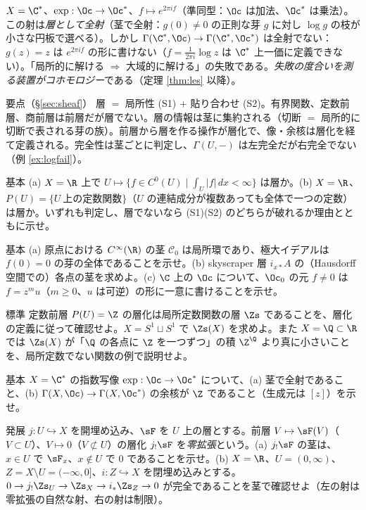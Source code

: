 \begin{ex}[全射な層の射だが大域切断は全射でない]\label{ex:logfail}
$X=\C^*$、$\exp:\Oc\to\Oc^*$、$f\mapsto e^{2\pi if}$（準同型：$\Oc$ は加法、$\Oc^*$ は乗法）。この射は\emph{層として全射}（茎で全射：$g(0)\ne0$ の正則な芽 $g$ に対し $\log g$ の枝が小さな円板で選べる）。しかし $\Gamma(\C^*,\Oc)\to\Gamma(\C^*,\Oc^*)$ は全射でない：$g(z)=z$ は $e^{2\pi if}$ の形に書けない（$f=\frac1{2\pi i}\log z$ は $\C^*$ 上一価に定義できない）。「局所的に解ける $\Rightarrow$ 大域的に解ける」の失敗である。\emph{失敗の度合いを測る装置がコホモロジー}である（定理 \ref{thm:les} 以降）。
\end{ex}

\begin{keybox}{要点（§\ref{sec:sheaf}）}
層 $=$ 局所性 (S1) $+$ 貼り合わせ (S2)。有界関数、定数前層、商前層は前層だが層でない。層の情報は茎に集約される（切断 $=$ 局所的に切断で表される芽の族）。前層から層を作る操作が層化で、像・余核は層化を経て定義される。完全性は茎ごとに判定し、$\Gamma(U,-)$ は左完全だが右完全でない（例 \ref{ex:logfail}）。
\end{keybox}

\begin{prob}{基本}\label{p:notsheaf}
(a) $X=\R$ 上で $U\mapsto\{f\in C^0(U)\mid\int_U|f|\,dx<\infty\}$ は層か。(b) $X=\R$、$P(U)=\{U\ \text{上の定数関数}\}$（$U$ の連結成分が複数あっても全体で一つの定数）は層か。いずれも判定し、層でないなら (S1)(S2) のどちらが破れるか理由とともに示せ。
\end{prob}
\begin{prob}{基本}\label{p:stalkO}
(a) 原点における $C^\infty(\R)$ の茎 $\mathcal C_0$ は局所環であり、極大イデアルは $f(0)=0$ の芽の全体であることを示せ。(b) skyscraper 層 $i_{x*}A$ の（Hausdorff 空間での）各点の茎を求めよ。(c) $\C$ 上の $\Oc$ について、$\Oc_0$ の元 $f\ne0$ は $f=z^mu$（$m\ge0$、$u$ は可逆）の形に一意に書けることを示せ。
\end{prob}
\begin{prob}{標準}\label{p:constsheaf}
定数前層 $P(U)=\Z$ の層化は局所定数関数の層 $\Zs$ であることを、層化の定義に従って確認せよ。$X=S^1\sqcup S^1$ で $\Zs(X)$ を求めよ。また $X=\Q\subset\R$ では $\Zs(X)$ が「$\Q$ の各点に $\Z$ を一つずつ」の積 $\Z^{\Q}$ より真に小さいことを、局所定数でない関数の例で説明せよ。
\end{prob}
\begin{prob}{基本}\label{p:expsurj}
$X=\C^*$ の指数写像 $\exp:\Oc\to\Oc^*$ について、(a) 茎で全射であること、(b) $\Gamma(X,\Oc)\to\Gamma(X,\Oc^*)$ の余核が $\Z$ であること（生成元は $[z]$）を示せ。
\end{prob}
\begin{prob}{発展}\label{p:extzero}
$j:U\hookrightarrow X$ を開埋め込み、$\sF$ を $U$ 上の層とする。前層 $V\mapsto\sF(V)$（$V\subset U$）、$V\mapsto0$（$V\not\subset U$）の層化 $j_!\sF$ を\emph{零拡張}という。(a) $j_!\sF$ の茎は、$x\in U$ で $\sF_x$、$x\notin U$ で $0$ であることを示せ。(b) $X=\R$、$U=(0,\infty)$、$Z=X\setminus U=(-\infty,0]$、$i:Z\hookrightarrow X$ を閉埋め込みとする。$0\to j_!\Zs_U\to\Zs_X\to i_*\Zs_Z\to0$ が完全であることを茎で確認せよ（左の射は零拡張の自然な射、右の射は制限）。
\end{prob}

